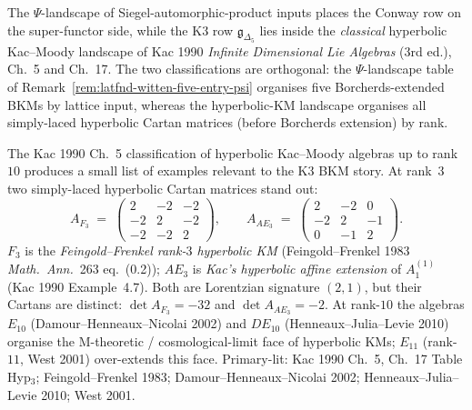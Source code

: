 The $\Psi$-landscape of Siegel-automorphic-product inputs places the
Conway row on the super-functor side, while the K3 row
$\mathfrak{g}_{\Delta_5}$ lies inside the \emph{classical}
hyperbolic Kac--Moody landscape of Kac
1990 \emph{Infinite Dimensional Lie Algebras} (3rd ed.), Ch.~5 and
Ch.~17. The two classifications are orthogonal: the $\Psi$-landscape
table of Remark~\ref{rem:latfnd-witten-five-entry-psi} organises
five Borcherds-extended BKMs by lattice input, whereas the
hyperbolic-KM landscape organises all simply-laced hyperbolic
Cartan matrices (before Borcherds extension) by rank.

\begin{remark}
\label{rem:latfnd-w19-drinfeld-cartan-table}
The Kac 1990 Ch.~5 classification of hyperbolic Kac--Moody algebras up
to rank~$10$ produces a small list of examples relevant to the K3
BKM story. At rank~$3$ two simply-laced hyperbolic Cartan matrices
stand out:
\[
 A_{F_3} \;=\; \begin{pmatrix} 2 & -2 & -2 \\ -2 & 2 & -2 \\ -2 & -2 & 2 \end{pmatrix},
 \qquad
 A_{AE_3} \;=\; \begin{pmatrix} 2 & -2 & 0 \\ -2 & 2 & -1 \\ 0 & -1 & 2 \end{pmatrix}.
\]
$F_3$ is the \emph{Feingold--Frenkel rank-$3$ hyperbolic KM}
(Feingold--Frenkel 1983 \emph{Math.\ Ann.}~263 eq.~(0.2));
$AE_3$ is \emph{Kac's hyperbolic affine extension} of $A_1^{(1)}$
(Kac 1990 Example~4.7). Both are Lorentzian signature $(2, 1)$, but
their Cartans are distinct:
$\det A_{F_3} = -32$ and $\det A_{AE_3} = -2$. At rank-$10$ the
algebras $E_{10}$ (Damour--Henneaux--Nicolai 2002) and $DE_{10}$
(Henneaux--Julia--Levie 2010) organise the M-theoretic /
cosmological-limit face of hyperbolic KMs; $E_{11}$ (rank-$11$, West
2001) over-extends this face. Primary-lit: Kac 1990 Ch.~5, Ch.~17
Table Hyp$_3$; Feingold--Frenkel 1983; Damour--Henneaux--Nicolai 2002;
Henneaux--Julia--Levie 2010; West 2001.
\end{remark}


